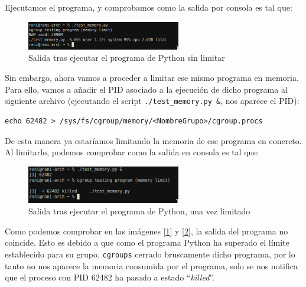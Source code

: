 \documentclass[12pt]{article}
\begin{document}
	\noindent Ejecutamos el programa, y comprobamos como la salida por consola es tal que: 
	
	\begin{figure}[h!]
		\begin{center}
			\includegraphics[width=0.6\textwidth]{img/cgroup_python1.png}
			\caption{Salida tras ejecutar el programa de Python sin limitar}
			\label{img: cgroup python 1}
		\end{center}
	\end{figure}

	\noindent Sin embargo, ahora vamos a proceder a limitar ese mismo programa en memoria. Para ello, vamos a añadir el PID asociado a la ejecución de dicho programa al siguiente archivo (ejecutando el script \texttt{./test\_memory.py \&}, nos aparece el PID):
	\begin{verbatim}
echo 62482 > /sys/fs/cgroup/memory/<NombreGrupo>/cgroup.procs
	\end{verbatim}
	
	\noindent De esta manera ya estaríamos limitando la memoria de ese programa en concreto. Al limitarlo, podemos comprobar como la salida en consola es tal que: 
	
	\begin{figure}[h!]
		\begin{center}
			\includegraphics[width=0.6\textwidth]{img/cgroup_python2.png}
			\caption{Salida tras ejecutar el programa de Python, una vez limitado}
			\label{img: cgroup python 2}
		\end{center}
	\end{figure}

	\pagebreak
	
	\noindent Como podemos comprobar en las imágenes [\ref{img: cgroup python 1}] y [\ref{img: cgroup python 2}], la salida del programa no coincide. Esto es debido a que como el programa Python ha superado el límite establecido para su grupo, \texttt{cgroups} cerrado bruscamente dicho programa, por lo tanto no nos aparece la memoria consumida por el programa, solo se nos notifica que el proceso con PID 62482 ha pasado a estado ``\textit{killed}''. \\
	
\end{document}
